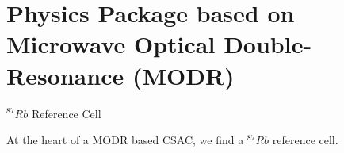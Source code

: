 \section{Physics Package based on Microwave Optical Double-Resonance (MODR)}

\begin{frame}{$^{87}Rb$ Reference Cell}

    At the heart of a MODR based CSAC, we find a $^{87}Rb$ reference cell.

    \vspace{10pt}

    \begin{columns}[c, onlytextwidth]

        \begin{column}{0.45\textwidth}

            \begin{figure}
                \centering

\end{figure}
\end{column}
\end{columns}
\end{frame}
